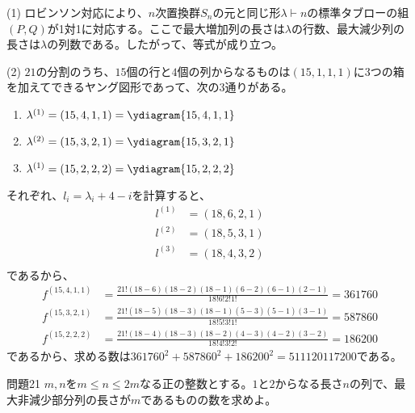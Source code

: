 \documentclass[a4paper,11pt]{jsarticle}
\theoremstyle{plain}
\theoremstyle{definition}
\renewcommand{\(}{\left(}
\renewcommand{\)}{\right)}
\renewcommand{\[}{\left[}
\renewcommand{\]}{\right]}
\renewcommand{\{}{\left\lbrace}
\renewcommand{\}}{\right\rbrace}
\begin{document}
\subitem (1)
ロビンソン対応により、$n$次置換群$S_n$の元と同じ形$\lambda \vdash n$の標準タブローの組$(P,Q)$が1対1に対応する。ここで最大増加列の長さは$\lambda$の行数、最大減少列の長さは$\lambda$の列数である。したがって、等式が成り立つ。

\subitem (2)
$21$の分割のうち、$15$個の行と$4$個の列からなるものは$(15,1,1,1)$に3つの箱を加えてできるヤング図形であって、次の3通りがある。
\begin{enumerate}
    \item $\lambda^{(1)} = (15,4,1,1) = \ydiagram{15,4,1,1}$
    \item $\lambda^{(2)} = (15,3,2,1) = \ydiagram{15,3,2,1}$
    \item $\lambda^{(1)} = (15,2,2,2) = \ydiagram{15,2,2,2}$
\end{enumerate}

それぞれ、$l_i = \lambda_i + 4 - i$を計算すると、
\begin{align*}
    l^{(1)} &= (18,6,2,1) \\
    l^{(2)} &= (18,5,3,1) \\
    l^{(3)} &= (18,4,3,2) \\
\end{align*}
であるから、
\begin{align*}
    f^{(15,4,1,1)} &= \frac{21!(18-6)(18-2)(18-1)(6-2)(6-1)(2-1)}{18!6!2!1!} = 361760 \\
    f^{(15,3,2,1)} &= \frac{21!(18-5)(18-3)(18-1)(5-3)(5-1)(3-1)}{18!5!3!1!} = 587860 \\
    f^{(15,2,2,2)} &= \frac{21!(18-4)(18-3)(18-2)(4-3)(4-2)(3-2)}{18!4!3!2!} = 186200 
\end{align*}
であるから、求める数は$361760^2 + 587860^2 + 186200^2 = 511120117200$である。



\begin{itembox}[l]{問題21}
    $m, n$を$m \leq n \leq 2m$なる正の整数とする。$1$と$2$からなる長さ$n$の列で、最大非減少部分列の長さが$m$であるものの数を求めよ。
\end{itembox}
\end{document}

